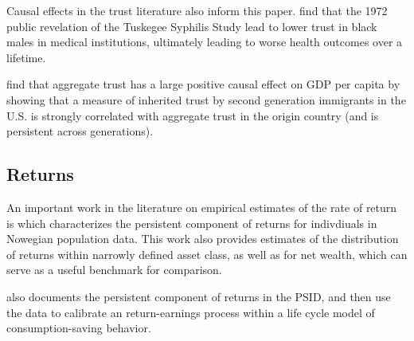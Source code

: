 
\par Causal effects in the trust literature also inform this paper. \cite{Alsan2018} find that the 1972 public revelation of the Tuskegee Syphilis Study lead to  lower trust in black males in medical institutions, ultimately leading to worse health outcomes over a lifetime.    %

\par \cite{Algan2010} find that aggregate trust has a large positive causal effect on GDP per capita by showing that a measure of inherited trust by second generation immigrants in the U.S. is strongly correlated with aggregate trust in the origin country (and is persistent across generations). %

 
\subsection{Returns}

\par An important work in the literature on empirical estimates of the rate of return is \cite{aflgdmlp20} which characterizes the persistent component of returns for indivdiuals in Nowegian population data. This work also provides estimates of the distribution of returns within narrowly defined asset class, as well as for net wealth, which can serve as a useful benchmark for comparison. %

\par \cite{Daminato2024} also documents the persistent component of returns in the PSID, and then use the data to calibrate an return-earnings process within a life cycle model of consumption-saving behavior. %